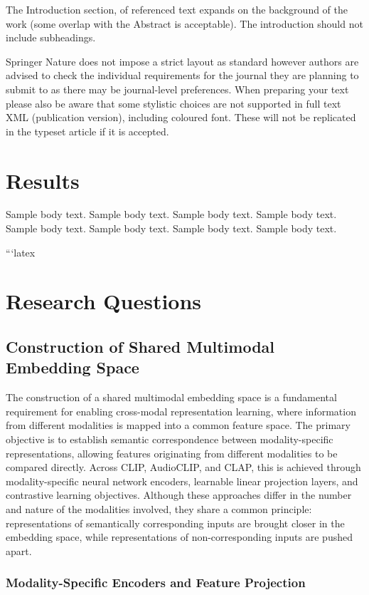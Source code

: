 \documentclass[pdflatex,sn-mathphys-num]{sn-jnl}%
\theoremstyle{thmstyleone}%
\theoremstyle{thmstyletwo}%
\theoremstyle{thmstylethree}%
\begin{document}
The Introduction section, of referenced text \cite{bib1} expands on the background of the work (some overlap with the Abstract is acceptable). The introduction should not include subheadings.

Springer Nature does not impose a strict layout as standard however authors are advised to check the individual requirements for the journal they are planning to submit to as there may be journal-level preferences. When preparing your text please also be aware that some stylistic choices are not supported in full text XML (publication version), including coloured font. These will not be replicated in the typeset article if it is accepted. 

\section{Results}\label{sec2}

Sample body text. Sample body text. Sample body text. Sample body text. Sample body text. Sample body text. Sample body text. Sample body text.

```latex
\section{Research Questions}\label{sec3}

\subsection{Construction of Shared Multimodal Embedding Space}\label{subsec3.1}

The construction of a shared multimodal embedding space is a fundamental requirement for enabling cross-modal representation learning, where information from different modalities is mapped into a common feature space. The primary objective is to establish semantic correspondence between modality-specific representations, allowing features originating from different modalities to be compared directly. Across CLIP, AudioCLIP, and CLAP, this is achieved through modality-specific neural network encoders, learnable linear projection layers, and contrastive learning objectives. Although these approaches differ in the number and nature of the modalities involved, they share a common principle: representations of semantically corresponding inputs are brought closer in the embedding space, while representations of non-corresponding inputs are pushed apart.

\subsubsection{Modality-Specific Encoders and Feature Projection}
\end{document}

